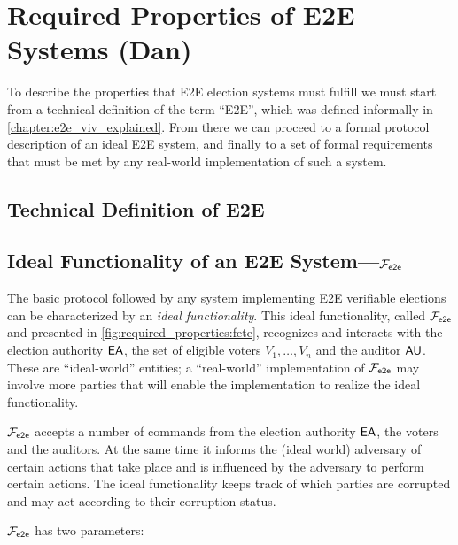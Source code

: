 \chapter{Required Properties of E2E Systems (Dan)}
\label{chapter:required_properties}

To describe the properties that E2E election systems must fulfill we
must start from a technical definition of the term ``E2E'', which was
defined informally in \autoref{chapter:e2e_viv_explained}. From there
we can proceed to a formal protocol description of an ideal E2E
system, and finally to a set of formal requirements that must be met
by any real-world implementation of such a system.

\section{Technical Definition of E2E}


\section{Ideal Functionality of an E2E System---$\mathcal{F}_{\mathsf{e2e}}$}
The basic protocol followed by any system implementing E2E verifiable
elections can be characterized by an \emph{ideal functionality}. This
ideal functionality, called $\mathcal{F}_{\mathsf{e2e}}$ and presented in
\autoref{fig:required_properties:fete}, recognizes and interacts with
the election authority $\mathsf{EA}$, the set of eligible voters
$V_1,\ldots, V_n$ and the auditor $\mathsf{AU}$.  These are ``ideal-world''
entities; a ``real-world'' implementation of $\mathcal{F}_{\mathsf{e2e}}$ may involve more
parties that will enable the implementation to realize the ideal
functionality.

$\mathcal{F}_{\mathsf{e2e}}$ accepts a number of commands from the election authority
$\mathsf{EA}$, the voters and the auditors. At the same time it informs the
(ideal world) adversary of certain actions that take place and is
influenced by the adversary to perform certain actions. The ideal
functionality keeps track of which parties are corrupted and may act
according to their corruption status.

$\mathcal{F}_{\mathsf{e2e}}$ has two parameters:

